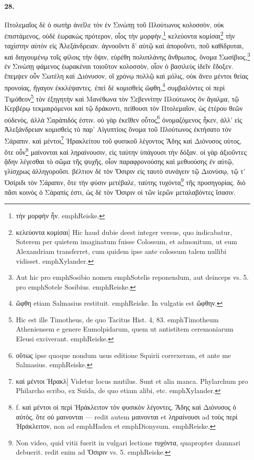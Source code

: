 \documentclass[a4paper, 11pt, oneside, polutonikogreek, german]{article}
\begin{document}
\paragraph{28.}
Πτολεμαῖος δὲ ὁ σωτὴρ ἀνεῖλε τὸν ἐν Σινώπῃ τοῦ Πλούτωνος κολοσσὸν, οὐκ ἐπιστάμενος, οὐδὲ ἑωρακὼς πρότερον, οἷος τὴν μορφὴν,\footnote{τὴν μορφὴν ἦν. emph{Reiske.}} κελεύοντα κομίσαι\footnote{κελεύοντα κομίσαι] Hic haud dubie deest integer versus, quo indicabatur, Soterem per quietem imaginatum fuisse Colossum, et admonitum, ut eum Alexandriam transferret, cum quidem ipse ante colossum talem nullibi vidisset. emph{Xylander.}} τὴν ταχίστην αὐτὸν εἰς Ἀλεξάνδρειαν. ἀγνοοῦντι δ' αὐτῷ καὶ ἀποροῦντι, ποῦ καθίδρυται, καὶ διηγουμένῳ τοῖς φίλοις τὴν ὄψιν, εὑρέθη πολυπλάνης ἄνθρωπος, ὄνομα Σωσίβιος,\footnote{Aut hic pro emph{Sosibio} nomen emph{Sotelis} reponendum, aut deinceps vs. 5. pro emph{Sotele Sosibius.} emph{Reiske.}} ἐν Σινώπῃ φάμενος ἑωρακέναι τοιοῦτον κολοσσὸν, οἷον ὁ βασιλεὺς ἰδεῖν ἔδοξεν. ἔπεμψεν οὖν Σωτέλη καὶ Διόνυσον, οἳ χρόνῳ πολλῷ καὶ μόλις, οὐκ ἄνευ μέντοι θείας προνοίας, ἤγαγον ἐκκλέψαντες. ἐπεὶ δὲ κομισθεὶς ὤφθη,\footnote{ὢφθη etiam Salmasius restituit. emph{Reiske.} In vulgatis est ὢφθην.} συμβαλόντες οἱ περὶ Τιμόθεον\footnote{Hic est ille Timotheus, de quo Tacitus Hist. 4, 83. emph{Timotheum Atheniensem e genere Eumolpidarum, quem ut antistitem ceremoniarum Eleusi exciverant.} emph{Reiske.}} τὸν ἐξηγητὴν καὶ Μανέθωνα τὸν Σεβεννίτην Πλούτωνος ὂν ἄγαλμα, τῷ Κερβέρῳ τεκμαιρόμενοι καὶ τῷ δράκοντι, πείθουσι τὸν Πτολεμαῖον, ὡς ἑτέρου θεῶν οὐδενὸς, ἀλλὰ Σαράπιδός ἐστιν. οὐ γὰρ ἐκεῖθεν οὗτος\footnote{οὕτως ipse quoque nondum usus editione Squirii correxeram, et ante me Salmasius. emph{Reiske.}} ὀνομαζόμενος ἧκεν, ἀλλ' εἰς Ἀλεξάνδρειαν κομισθεὶς τὸ παρ' Αἰγυπτίοις ὄνομα τοῦ Πλούτωνος ἐκτήσατο τὸν Σάραπιν. καὶ μέντοι\footnote{καὶ μέντοι Ἡρακλ] Videtur locus mutilus. Sunt et alia manca. Phylarchum pro Philarcho scribo, ex Suida, de quo etiam alibi, etc. emph{Xylander.}} Ἡρακλείτου τοῦ φυσικοῦ λέγοντος Ἅδης καὶ Διόνυσος οὑτος, ὅτε οὖν\footnote{f. καὶ μέντοι οἱ περὶ Ἡράκλειτον τὸν φυσικὸν λέγοντες, Ἅδης καὶ Διόνυσος ὁ αὐτὸς, ὅτε οὐ μαινονται --- redit autem μαινονται et ληραίνουσι ad τοὺς περὶ Ἡράκλειτον, non ad emph{Haden} et emph{Dionysum}. emph{Reiske.}} μαίνονται καὶ ληραίνουσιν, εἰς ταύτην ὑπάγουσι τὴν δόξαν. οἱ γὰρ ἀξιοῦντες ᾅδην λέγεσθαι τὸ σῶμα τῆς ψυχῆς, οἷον παραφρονούσης καὶ μεθυούσης ἐν αὐτῷ, γλίσχρως ἀλληγοροῦσι. βέλτιον δὲ τὸν Ὄσιριν εἰς ταυτὸ συνάγειν τῷ Διονύσῳ, τῷ τ' Ὀσίριδι τὸν Σάραπιν, ὅτε τὴν φύσιν μετέβαλε, ταύτης τυχόντα\footnote{Non video, quid vitii fuerit in vulgari lectione τυχόντα, quapropter damnari debuerit. redit enim ad Ὄσιριν vs. 5. emph{Reiske.}} τῆς προσηγορίας. διὸ πᾶσι κοινὸς ὁ Σάραπίς ἐστι, ὡς δὲ τὸν Ὄσιριν οἱ τῶν ἱερῶν μεταλαβόντες ἴσασιν.
\end{document}
